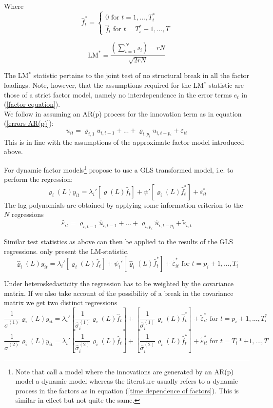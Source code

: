 \documentclass[11pt]{article}
\begin{document}
Where 
$$\hat f_t^* = \begin{cases} 0 \text{ for } t=1, ..., T_i^* \\ \hat f_t \text{ for } t=T_i^*+1, ..., T \end{cases}$$

\begin{equation}
	\label{LM-Statistic}
	\text{LM}^* = \frac{\left( \sum_{i=1}^N s_i \right) -rN}{\sqrt{2rN}}
\end{equation}

The LM$^*$ statistic pertains to the joint test of no structural break in all the factor loadings. Note, however, that the assumptions required for the LM$^*$ statistic are those of a strict factor model, namely no interdependence in the error terms $e_t$ in (\ref{factor equation}). \\


We follow \citet{breitung2011testing} in assuming an AR(p) process for the innovation term as in equation (\ref{errors AR(p)}):
\begin{equation}
	\label{errors AR(p)}
	u_{it} = \varrho_{i, 1} u_{i, t-1} + ... + \varrho_{i, p_i} u_{i, t-p_i} + \varepsilon_{it}
\end{equation}
This is in line with the assumptions of the approximate factor model introduced above.

For dynamic factor models\footnote{Note that \citet{breitung2011testing} call a model where the innovations are generated by an AR(p) model a dynamic model whereas the literature usually refers to a dynamic process in the factors as in equation (\ref{time dependence of factors}). This is similar in effect but not quite the same.} \citet{breitung2011testing} propose to use a GLS transformed model, i.e. to perform the regression:
$$\varrho_i(L) y_{it} = \lambda_i'[\varrho(L) \hat f_t] + \psi' [\varrho_i(L) \hat f_t^*] + \varepsilon^*_{it}$$
The lag polynomials are obtained by applying some information criterion to the $N$ regressions
$$\hat \varepsilon_{it} = \varrho_{i, t-1} \hat u_{i, t-1} + ... + \varrho_{i, p_i} \hat u_{i, t-p_i} + \tilde \varepsilon_{i,t}$$

Similar test statistics as above can then be applied to the results of the GLS regressions. \citet{breitung2011testing} only present the LM-statistic.
$$\hat \varrho_i(L) y_{it} = \lambda_i' \left[\varrho_i(L) \hat f_t\right] + \psi_i' \left[\hat \varrho_i(L) \hat f_t^*\right] + \tilde \varepsilon^*_{it} \text{ for } t= p_i+1, ..., T_i$$

Under heteroskedasticity the regression has to be weighted by the covariance matrix. If we also take account of the possibility of a break in the covariance matrix we get two distinct regressions
$$\frac{1}{\hat \sigma^{(1)}} \varrho_i(L) y_{it} = \lambda_i' \left[\frac{1}{\hat \sigma_i^{(1)}} \varrho_i(L) \hat f_t\right] + \left[\frac{1}{\hat \sigma_i^{(1)}} \varrho_i(L) \hat f_t^*\right] + \tilde \varepsilon^*_{it} \text{ for } t = p_i+1, ..., T^*_i$$
$$\frac{1}{\hat \sigma^{(2)}} \varrho_i(L) y_{it} = \lambda_i' \left[\frac{1}{\hat \sigma_i^{(2)}} \varrho_i(L) \hat f_t\right] + \left[\frac{1}{\hat \sigma_i^{(2)}} \varrho_i(L) \hat f_t^*\right] + \tilde \varepsilon^*_{it} \text{ for } t = T_i*+1, ..., T$$
\end{document}
